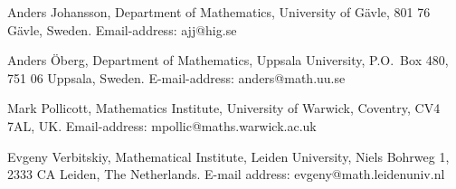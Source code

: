 \documentclass[11pt, a4paper, oneside]{article}
\theoremstyle{definition}
\theoremstyle{remark}
\begin{document}
\noindent
\newline

\noindent
Anders Johansson, Department of Mathematics, University of G\"avle,
801 76 G\"avle, Sweden. Email-address: ajj@hig.se\newline

\noindent
Anders \"Oberg, Department of Mathematics, Uppsala University, P.O.\
Box 480, 751 06 Uppsala, Sweden. E-mail-address:
anders@math.uu.se\newline

\noindent
Mark Pollicott, Mathematics Institute, University of Warwick,
Coventry, CV4 7AL, UK. Email-address: mpollic@maths.warwick.ac.uk\newline

\noindent
Evgeny Verbitskiy, Mathematical Institute, Leiden University,
Niels Bohrweg 1, 2333 CA Leiden, The Netherlands. E-mail address: evgeny@math.leidenuniv.nl
\end{document}
